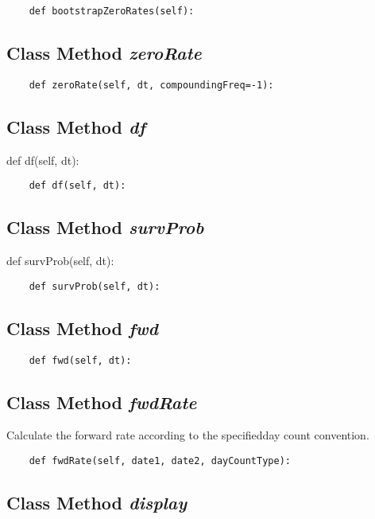 \documentclass[twoside,11pt]{book}
\begin{document}
\begin{lstlisting}
    def bootstrapZeroRates(self):
\end{lstlisting}

\subsection{Class Method {\it zeroRate}}


\begin{lstlisting}
    def zeroRate(self, dt, compoundingFreq=-1):
\end{lstlisting}

\subsection{Class Method {\it df}}
def df(self, dt):

\begin{lstlisting}
    def df(self, dt):
\end{lstlisting}

\subsection{Class Method {\it survProb}}
def survProb(self, dt):

\begin{lstlisting}
    def survProb(self, dt):
\end{lstlisting}

\subsection{Class Method {\it fwd}}


\begin{lstlisting}
    def fwd(self, dt):
\end{lstlisting}

\subsection{Class Method {\it fwdRate}}
Calculate the forward rate according to the specifiedday count convention. 

\begin{lstlisting}
    def fwdRate(self, date1, date2, dayCountType):
\end{lstlisting}

\subsection{Class Method {\it display}}
\end{document}
